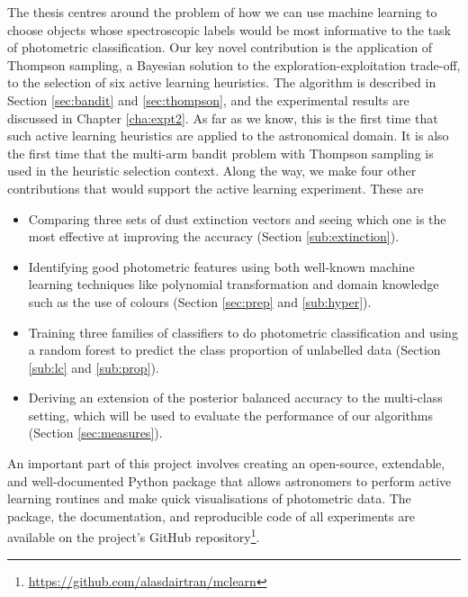 The thesis centres around the problem of how we can use machine learning to choose objects whose
spectroscopic labels would be most informative to the task of photometric classification. Our key
novel contribution is the application of Thompson sampling, a Bayesian solution to the
exploration-exploitation trade-off, to the selection of six active learning heuristics. The
algorithm is described in Section \ref{sec:bandit} and \ref{sec:thompson}, and the experimental
results are discussed in Chapter \ref{cha:expt2}. As far as we know, this is the first time that
such active learning heuristics are applied to the astronomical domain. It is also the first time
that the multi-arm bandit problem with Thompson sampling is used in the heuristic selection
context. Along the way, we make four other contributions that would support the active learning
experiment. These are
	\begin{itemize}
		\item Comparing three sets of dust extinction vectors and seeing which one is the most
		effective at improving the accuracy (Section \ref{sub:extinction}).
		
		\item Identifying good photometric features using both well-known machine learning techniques
		like polynomial transformation and domain knowledge such as the use of colours (Section
		\ref{sec:prep} and \ref{sub:hyper}).
		
		\item Training three families of classifiers to do photometric classification and using
		a random forest to predict the class proportion of unlabelled data (Section \ref{sub:lc}
		and \ref{sub:prop}).
		
		\item Deriving an extension of the posterior balanced accuracy to the multi-class
		setting, which will be used to evaluate the performance of our algorithms (Section 
		\ref{sec:measures}).
	\end{itemize}
An important part of this project involves creating an open-source, extendable, and well-documented
Python package that allows astronomers to perform active learning routines and make quick
visualisations of photometric data. The package, the documentation, and reproducible code of all
experiments are available on the project's GitHub repository\footnote{
    \url{https://github.com/alasdairtran/mclearn}}.


